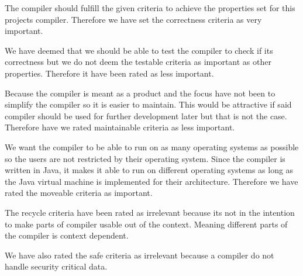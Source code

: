 The compiler should fulfill the given criteria to achieve the properties set for this projects compiler. Therefore we have set the correctness criteria as very important.

We have deemed that we should be able to test the compiler to check if its correctness but we do not deem the testable criteria as important as other properties. Therefore it have been rated as less important.

Because the compiler is meant as a product and the focus have not been to simplify the compiler so it is easier to maintain. This would be attractive if said compiler should be used for further development later but that is not the case. Therefore have we rated maintainable criteria as less important.

We want the compiler to be able to run on as many operating systems as possible so the users are not restricted by their operating system. Since the compiler is written in Java, it makes it able to run on different operating systems as long as the Java virtual machine is implemented for their architecture. Therefore we have rated the moveable criteria as important.

The recycle criteria have been rated as irrelevant because its not in the intention to make parts of compiler usable out of the context. Meaning different parts of the compiler is context dependent.

We have also rated the safe criteria as irrelevant because a compiler do not handle security critical data.